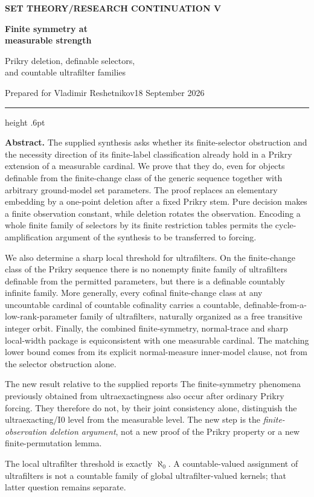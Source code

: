 \documentclass[11pt,letterpaper]{article}
\theoremstyle{definition}
\numberwithin{equation}{section}
\newcommand{\Izero}{\mathrm{I0}}
\begin{document}
\thispagestyle{empty}
{\sffamily\bfseries\small\color{Olive}SET THEORY\quad /\quad RESEARCH CONTINUATION V}

\vspace{13pt}
{\fontsize{28}{31}\selectfont\bfseries\color{Forest}Finite symmetry at\\measurable strength\par}
\vspace{10pt}
{\fontsize{14}{18}\selectfont Prikry deletion, definable selectors,\\and countable ultrafilter families\par}
\vspace{14pt}
{\color{Muted}Prepared for Vladimir Reshetnikov\hfill 18 September 2026\par}
\vspace{3pt}
{\color{Sage}\hrule height .6pt}
\vspace{12pt}

\textbf{Abstract.}
The supplied synthesis asks whether its finite-selector obstruction and the necessity direction of its finite-label classification already hold in a Prikry extension of a measurable cardinal. We prove that they do, even for objects definable from the finite-change class of the generic sequence together with arbitrary ground-model set parameters. The proof replaces an elementary embedding by a one-point deletion after a fixed Prikry stem. Pure decision makes a finite observation constant, while deletion rotates the observation. Encoding a whole finite family of selectors by its finite restriction tables permits the cycle-amplification argument of the synthesis to be transferred to forcing.

We also determine a sharp local threshold for ultrafilters. On the finite-change class of the Prikry sequence there is no nonempty finite family of ultrafilters definable from the permitted parameters, but there is a definable countably infinite family. More generally, every cofinal finite-change class at any uncountable cardinal of countable cofinality carries a countable, definable-from-a-low-rank-parameter family of ultrafilters, naturally organized as a free transitive integer orbit. Finally, the combined finite-symmetry, normal-trace and sharp local-width package is equiconsistent with one measurable cardinal. The matching lower bound comes from its explicit normal-measure inner-model clause, not from the selector obstruction alone.

\begin{assessment}{The new result relative to the supplied reports}
The finite-symmetry phenomena previously obtained from ultraexactingness also occur after ordinary Prikry forcing. They therefore do not, by their joint consistency alone, distinguish the ultraexacting/$\Izero$ level from the measurable level. The new step is the \emph{finite-observation deletion argument}, not a new proof of the Prikry property or a new finite-permutation lemma.

The local ultrafilter threshold is exactly $\aleph_0$. A countable-valued assignment of ultrafilters is not a countable family of global ultrafilter-valued kernels; that latter question remains separate.
\end{assessment}
\end{document}
